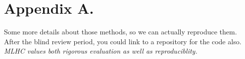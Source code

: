 \documentclass[pmlr]{jmlr}%
\begin{document}



\appendix
\section*{Appendix A.}

Some more details about those methods, so we can actually reproduce
them.  After the blind review period, you could link to a repository
for the code also.  \emph{MLHC values both rigorous evaluation as well
  as reproduciblity.}
\end{document}
